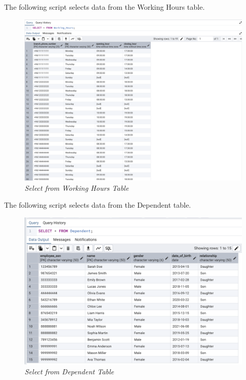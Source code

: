 The following script selects data from the Working Hours table.


\begin{figure}[H]
  \centering
  \includegraphics[width=1\textwidth]{images/sql/select/working_hours.png}
  \caption{\textit{Select from Working Hours Table}}
\end{figure}

The following script selects data from the Dependent table.


\begin{figure}[H]
  \centering
  \includegraphics[width=1\textwidth]{images/sql/select/dependent.png}
  \caption{\textit{Select from Dependent Table}}
\end{figure}

